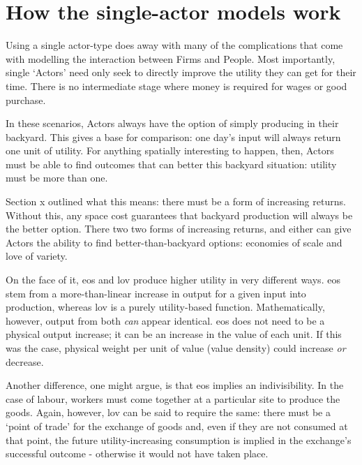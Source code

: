 \section{How the single-actor models work \label{sec:singleactorFramework}}

Using a single actor-type does away with many of the complications that come with modelling the interaction between Firms and People. Most importantly, single `Actors' need only seek to directly improve the utility they can get for their time. There is no intermediate stage where money is required for wages or good purchase.

In these scenarios, Actors always have the option of simply producing in their backyard. This gives a base for comparison: one day's input will always return one unit of utility. For anything spatially interesting to happen, then, Actors must be able to find outcomes that can better this backyard situation: utility must be more than one.

Section x outlined what this means: there must be a form of increasing returns. Without this, any space cost guarantees that backyard production will always be the better option. There two two forms of increasing returns, and either can give Actors the ability to find better-than-backyard options: economies of scale and love of variety.


On the face of it, \gls{eos} and \gls{lov} produce higher utility in very different ways. \gls{eos} stem from a more-than-linear increase in output for a given input into production, whereas \gls{lov} is a purely utility-based function. Mathematically, however, output from both \emph{can} appear identical. \gls{eos} does not need to be a physical output increase; it can be an increase in the value of each unit. If this was the case, physical weight per unit of value (value density) could increase \emph{or} decrease.

Another difference, one might argue, is that \gls{eos} implies an indivisibility. In the case of labour, workers must come together at a particular site to produce the goods. Again, however, \gls{lov} can be said to require the same: there must be a `point of trade' for the exchange of goods and, even if they are not consumed at that point, the future utility-increasing consumption is implied in the exchange's successful outcome - otherwise it would not have taken place.



